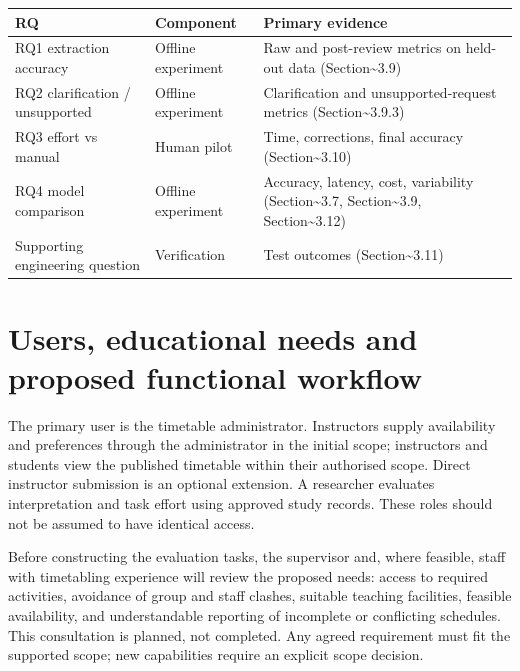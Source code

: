 \documentclass[
  11pt,a4paper,oneside]{report}
\begin{document}
\begin{longtable}[]{@{}p{\dimexpr(\linewidth-6\tabcolsep)/3\relax}p{\dimexpr(\linewidth-6\tabcolsep)/3\relax}p{\dimexpr(\linewidth-6\tabcolsep)/3\relax}@{}}
\toprule\noalign{}
RQ & Component & Primary evidence \\
\midrule\noalign{}
\endhead
\bottomrule\noalign{}
\endlastfoot
RQ1 extraction accuracy & Offline experiment & Raw and post-review
metrics on held-out data (Section\textasciitilde3.9) \\
RQ2 clarification / unsupported & Offline experiment & Clarification and
unsupported-request metrics (Section\textasciitilde3.9.3) \\
RQ3 effort vs manual & Human pilot & Time, corrections, final accuracy
(Section\textasciitilde3.10) \\
RQ4 model comparison & Offline experiment & Accuracy, latency, cost,
variability (Section\textasciitilde3.7, Section\textasciitilde3.9,
Section\textasciitilde3.12) \\
Supporting engineering question & Verification & Test outcomes
(Section\textasciitilde3.11) \\
\end{longtable}

\section{Users, educational needs and proposed functional workflow}\label{system-architecture-and-separation-of-concerns}
The primary user is the timetable administrator. Instructors supply availability and preferences through the administrator in the initial scope; instructors and students view the published timetable within their authorised scope. Direct instructor submission is an optional extension. A researcher evaluates interpretation and task effort using approved study records. These roles should not be assumed to have identical access.

Before constructing the evaluation tasks, the supervisor and, where feasible, staff with timetabling experience will review the proposed needs: access to required activities, avoidance of group and staff clashes, suitable teaching facilities, feasible availability, and understandable reporting of incomplete or conflicting schedules. This consultation is planned, not completed. Any agreed requirement must fit the supported scope; new capabilities require an explicit scope decision.
\end{document}
